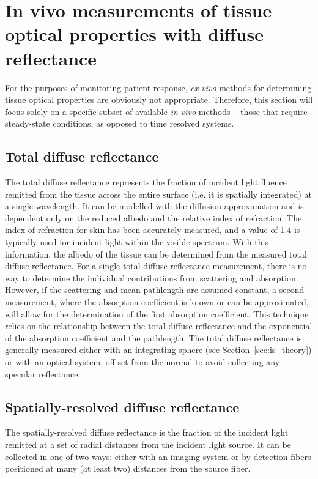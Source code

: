 \section{In vivo measurements of tissue optical properties with diffuse reflectance}
\label{sec:diff_refl}
For the purposes of monitoring patient response, \emph{ex vivo} methods for determining tissue optical properties are obviously not appropriate. Therefore, this section will focus solely on a specific subset of available \emph{in vivo} methods – those that require steady-state conditions, as opposed to time resolved systems.

\subsection{Total diffuse reflectance}
\label{sec:total_diff_refl}
The total diffuse reflectance represents the fraction of incident light fluence remitted from the tissue across the entire surface (i.e. it is spatially integrated) at a single wavelength. It can be modelled with the diffusion approximation and is dependent only on the reduced albedo and the relative index of refraction.\cite{Kim2011} The index of refraction for skin has been accurately measured, and a value of 1.4 is typically used for incident light within the visible spectrum.\cite{Kienle1996a} With this information, the albedo of the tissue can be determined from the measured total diffuse reflectance. For a single total diffuse reflectance measurement, there is no way to determine the individual contributions from scattering and absorption. However, if the scattering and mean pathlength are assumed constant, a second measurement, where the absorption coefficient is known or can be approximated, will allow for the determination of the first absorption coefficient. This technique relies on the relationship between the total diffuse reflectance and the exponential of the absorption coefficient and the pathlength. The total diffuse reflectance is generally measured either with an integrating sphere (see Section~\ref{sec:is_theory}) or with an optical system, off-set from the normal to avoid collecting any specular reflectance.

\subsection{Spatially-resolved diffuse reflectance}
\label{sec:spat_diff_refl}
The spatially-resolved diffuse reflectance is the fraction of the incident light remitted at a set of radial distances from the incident light source. It can be collected in one of two ways: either with an imaging system\cite{Kienle1996b} or by detection fibers positioned at many (at least two) distances from the source fiber.\cite{Kim2011}

